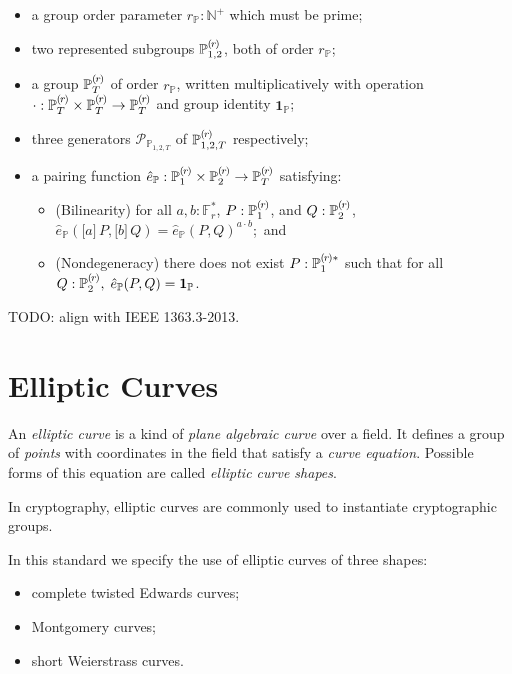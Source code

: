 \documentclass{article}
\newcommand{\typecolon}{:}
\newcommand{\PosInt}{\mathbb{N}^+}
\newcommand{\Fieldstar}[1]{\mathbb{F}^\ast_{#1}}
\newcommand{\mult}{\cdot}
\newcommand{\scalarmult}[2]{\boldsymbol{[}{#1}\boldsymbol{]}\,{#2}}
\newcommand{\Generator}{\mathcal{P}}
\newcommand{\subgroupr}{(\kern-0.075emr\kern-0.075em)}
\newcommand{\ParamP}[1]{{{#1}_\mathbb{P}}}
\newcommand{\GroupP}[1]{\mathbb{P}_{#1}}
\newcommand{\SubgroupP}[1]{\GroupP{#1}^{\subgroupr}}
\newcommand{\SubgroupPstar}[1]{\GroupP{#1}^{\subgroupr\ast}}
\newcommand{\OneP}{\ParamP{\mathbf{1}}}
\newcommand{\GenP}[1]{\Generator_{\GroupP{#1}}}
\newcommand{\PairingP}{\ParamP{\hat{e}}}
\begin{document}
\begin{itemize}
  \item a group order parameter $\ParamP{r} \typecolon \PosInt$ which must be prime;
  \item two represented subgroups $\SubgroupP{1, 2}$, both of order $\ParamP{r}$;
  \item a group $\SubgroupP{T}$ of order $\ParamP{r}$, written multiplicatively with operation\,
        $\mult \typecolon \SubgroupP{T} \times \SubgroupP{T} \rightarrow \SubgroupP{T}$
        and group identity $\ParamP{\mathbf{1}}$;
  \item three generators $\GenP{1, 2, T}$ of $\SubgroupP{1, 2, T}$ respectively;
  \item a pairing function
        $\PairingP \typecolon \SubgroupP{1} \times \SubgroupP{2} \rightarrow \SubgroupP{T}$
        satisfying:

        \begin{itemize}
          \item (Bilinearity)\; for all $a, b \typecolon \Fieldstar{r}$,
                $P \typecolon \SubgroupP{1}$, and $Q \typecolon \SubgroupP{2}$,\;
                $\PairingP(\scalarmult{a}{P}, \scalarmult{b}{Q}) = \PairingP(P, Q)^{a \mult b}$;\, and
          \item (Nondegeneracy)\; there does not exist $P \typecolon \SubgroupPstar{1}$
                such that for all $Q \typecolon \SubgroupP{2},\;
                \PairingP(P, Q) = \OneP$.
        \end{itemize}
\end{itemize}

TODO: align with IEEE 1363.3-2013.


\section{Elliptic Curves} \label{curves}

An \emph{elliptic curve} is a kind of \emph{plane algebraic curve} over a field.
It defines a group of \emph{points} with coordinates in the field that satisfy a
\emph{curve equation}. Possible forms of this equation are called \emph{elliptic curve shapes}.

In cryptography, elliptic curves are commonly used to instantiate cryptographic groups.

In this standard we specify the use of elliptic curves of three shapes:

\begin{itemize}
  \item complete twisted Edwards curves;
  \item Montgomery curves;
  \item short Weierstrass curves.
\end{itemize}
\end{document}

